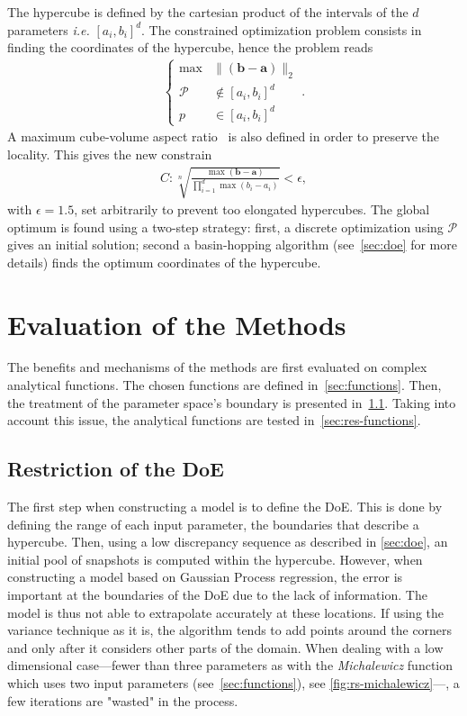 The hypercube is defined by the cartesian product of the intervals of the ${d}$ parameters \textit{i.e.} $[a_i, b_i]^{d}$. The constrained optimization problem consists in finding the coordinates of the hypercube, hence the problem reads
\begin{align}
\left\{\begin{array}{rc} \max  &\parallel (\mathbf{b} - \mathbf{a}) \parallel_{2} \\\mathcal{P} &\notin [a_i, b_i]^{d} \\ p &\in [a_i, b_i]^{d} \end{array}\right. .
\end{align}
A maximum cube-volume aspect ratio~\cite{smith1998} is also defined in order to preserve the locality. This gives the new constrain
\begin{align}
C : \sqrt[n]{\frac{\max (\mathbf{b} - \mathbf{a})}{\displaystyle\prod_{i = 1}^{d} \max (b_i - a_i)}} < \epsilon ,
\end{align}
with $\epsilon = 1.5$, set arbitrarily to prevent too elongated hypercubes. The global optimum is found using a two-step strategy: first, a discrete optimization using $\mathcal{P}$ gives an initial solution; second a basin-hopping algorithm (see~\cref{sec:doe} for more details) finds the optimum coordinates of the hypercube.


\section{Evaluation of the Methods}

The benefits and mechanisms of the methods are first evaluated on complex analytical functions. The chosen functions are defined in~\cref{sec:functions}. Then, the treatment of the parameter space's boundary is presented in~\cref{sec:delta-space}. Taking into account this issue, the analytical functions are tested in~\cref{sec:res-functions}.

\subsection{Restriction of the DoE}
\label{sec:delta-space}

The first step when constructing a model is to define the DoE. This is done by defining the range of each input parameter, the boundaries that describe a hypercube. Then, using a low discrepancy sequence as described in \cref{sec:doe}, an initial pool of snapshots is computed within the hypercube. However, when constructing a model based on Gaussian Process regression, the error is important at the boundaries of the DoE due to the lack of information. The model is thus not able to extrapolate accurately at these locations. If using the variance technique as it is, the algorithm tends to add points around the corners and only after it considers other parts of the domain. When dealing with a low dimensional case---fewer than three parameters as with the \textit{Michalewicz} function which uses two input parameters (see~\cref{sec:functions}), see \cref{fig:rs-michalewicz}---, a few iterations are "wasted" in the process.

